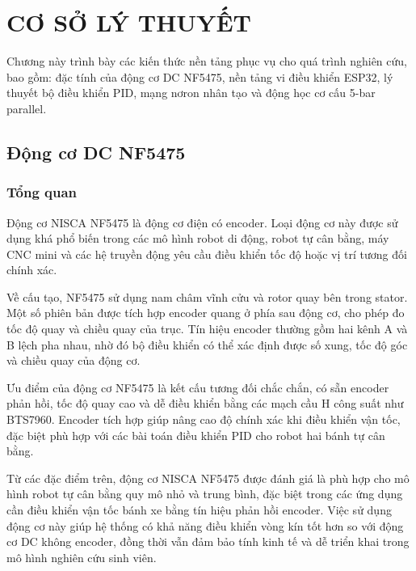
\chapter{CƠ SỞ LÝ THUYẾT}
\label{chap:cosolythuyet}

Chương này trình bày các kiến thức nền tảng phục vụ cho quá trình nghiên cứu,
bao gồm: đặc tính của động cơ DC NF5475, nền tảng vi điều khiển ESP32, lý thuyết
bộ điều khiển PID, mạng nơron nhân tạo và động học cơ cấu 5-bar parallel.



\section{Động cơ DC NF5475}

\subsection{Tổng quan}

Động cơ NISCA NF5475 là động cơ điện có encoder. Loại động cơ này được sử dụng khá phổ biến trong các mô hình robot di động, robot tự cân bằng, máy CNC mini và các hệ truyền động yêu cầu điều khiển tốc độ hoặc vị trí tương đối chính xác.

Về cấu tạo, NF5475 sử dụng nam châm vĩnh cửu và rotor quay bên trong stator. Một số phiên bản được tích hợp encoder quang ở phía sau động cơ, cho phép đo tốc độ quay và chiều quay của trục. Tín hiệu encoder thường gồm hai kênh A và B lệch pha nhau, nhờ đó bộ điều khiển có thể xác định được số xung, tốc độ góc và chiều quay của động cơ.

Ưu điểm của động cơ NF5475 là kết cấu tương đối chắc chắn, có sẵn encoder phản hồi, tốc độ quay cao và dễ điều khiển bằng các mạch cầu H công suất như BTS7960. Encoder tích hợp giúp nâng cao độ chính xác khi điều khiển vận tốc, đặc biệt phù hợp với các bài toán điều khiển PID cho robot hai bánh tự cân bằng.

Từ các đặc điểm trên, động cơ NISCA NF5475 được đánh giá là phù hợp cho mô hình robot tự cân bằng quy mô nhỏ và trung bình, đặc biệt trong các ứng dụng cần điều khiển vận tốc bánh xe bằng tín hiệu phản hồi encoder. Việc sử dụng động cơ này giúp hệ thống có khả năng điều khiển vòng kín tốt hơn so với động cơ DC không encoder, đồng thời vẫn đảm bảo tính kinh tế và dễ triển khai trong mô hình nghiên cứu sinh viên.
